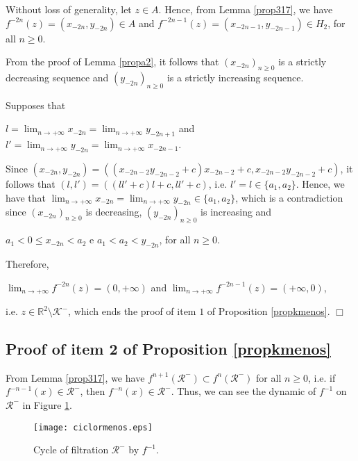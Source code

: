 \documentclass[11pt]{amsart}
\theoremstyle{definition}
\begin{document}
Without loss of generality, let $z\in A$. Hence, from Lemma
\ref{prop317}, we have $f^{-2n}(z)=(x_{-2n},y_{-2n})\in A$ and
$f^{-2n-1}(z)=(x_{-2n-1},y_{-2n-1})\in H_2$, for all $n\geq 0$.

From the proof of Lemma \ref{propa2}, it follows that
$(x_{-2n})_{n\geq 0}$ is a strictly decreasing sequence and
$(y_{-2n})_{n\geq 0}$ is a strictly increasing sequence.

Supposes that
\begin{center}
$\displaystyle l=\lim_{n\to +\infty}
x_{-2n}=\lim_{n\to +\infty} y_{-2n+1}$ and $\displaystyle
l'=\lim_{n\to +\infty} y_{-2n}=\lim_{n\to+\infty} x_{-2n-1}$.
\end{center}

Since $(x_{-2n},y_{-2n})=((x_{-2n-2}y_{-2n-2}+c)x_{-2n-2}+c,
x_{-2n-2}y_{-2n-2}+c)$, it follows that $(l,l')=((ll'+c)l+c,ll'+c)$, i.e. $l'=l\in\{a_1,a_2\}$.
Hence, we have that $\displaystyle \lim_{n\to +\infty}
x_{-2n}=\lim_{n\to +\infty}
y_{-2n}\in\{a_1,a_2\}$, which is a contradiction since $(x_{-2n})_{n\geq 0}$ is decreasing, $(y_{-2n})_{n\geq 0}$ is increasing and

\begin{center}
	$a_1<0\leq x_{-2n}<a_2$ e $a_1<a_2< y_{-2n}$, for all $n\geq 0$.
\end{center}

Therefore,

\begin{center}
	$\displaystyle \lim_{n\to+\infty}f^{-2n}(z)=(0,+\infty)$ and
	$\displaystyle \lim_{n\to+\infty}f^{-2n-1}(z)=(+\infty,0)$,
\end{center}

\noindent i.e. $z\in\mathbb{R}^2\setminus \mathcal{K}^-$, which ends the proof of item $1$ of Proposition \ref{propkmenos}. \hfill $\Box$ 





\subsection{Proof of item 2 of Proposition \ref{propkmenos}} \label{doispropkmenos}
From Lemma \ref{prop317}, we have $f^{n+1}(\mathcal{R}^-)\subset f^{n}(\mathcal{R}^-)$ for all $n\geq 0$, i.e. if $f^{-n-1}(x)\in\mathcal{R}^-$, then $f^{-n}(x)\in\mathcal{R}^-$. Thus, we can see the dynamic of $f^{-1}$ on $\mathcal{R}^-$ in Figure \ref{figrmenos}.
\begin{figure}[!h]
	\centering
	\texttt{[image: ciclormenos.eps]}
	\caption{Cycle of filtration $\mathcal{R}^-$ by $f^{-1}$.}
	\label{figrmenos}
\end{figure}
\end{document}
